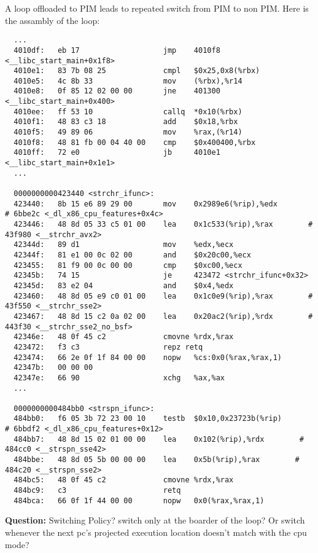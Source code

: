 \documentclass[11pt]{article}
\begin{document}
A loop offloaded to PIM leads to repeated switch from PIM to non PIM. Here is the assambly of the loop:
\begin{framed}
	\begin{verbatim}
  ...
  4010df:	eb 17                	jmp    4010f8 <__libc_start_main+0x1f8>
  4010e1:	83 7b 08 25          	cmpl   $0x25,0x8(%rbx)
  4010e5:	4c 8b 33             	mov    (%rbx),%r14
  4010e8:	0f 85 12 02 00 00    	jne    401300 <__libc_start_main+0x400>
  4010ee:	ff 53 10             	callq  *0x10(%rbx)
  4010f1:	48 83 c3 18          	add    $0x18,%rbx
  4010f5:	49 89 06             	mov    %rax,(%r14)
  4010f8:	48 81 fb 00 04 40 00 	cmp    $0x400400,%rbx
  4010ff:	72 e0                	jb     4010e1 <__libc_start_main+0x1e1>
  ...
  
  0000000000423440 <strchr_ifunc>:
  423440:	8b 15 e6 89 29 00    	mov    0x2989e6(%rip),%edx        # 6bbe2c <_dl_x86_cpu_features+0x4c>
  423446:	48 8d 05 33 c5 01 00 	lea    0x1c533(%rip),%rax        # 43f980 <__strchr_avx2>
  42344d:	89 d1                	mov    %edx,%ecx
  42344f:	81 e1 00 0c 02 00    	and    $0x20c00,%ecx
  423455:	81 f9 00 0c 00 00    	cmp    $0xc00,%ecx
  42345b:	74 15                	je     423472 <strchr_ifunc+0x32>
  42345d:	83 e2 04             	and    $0x4,%edx
  423460:	48 8d 05 e9 c0 01 00 	lea    0x1c0e9(%rip),%rax        # 43f550 <__strchr_sse2>
  423467:	48 8d 15 c2 0a 02 00 	lea    0x20ac2(%rip),%rdx        # 443f30 <__strchr_sse2_no_bsf>
  42346e:	48 0f 45 c2          	cmovne %rdx,%rax
  423472:	f3 c3                	repz retq 
  423474:	66 2e 0f 1f 84 00 00 	nopw   %cs:0x0(%rax,%rax,1)
  42347b:	00 00 00 
  42347e:	66 90                	xchg   %ax,%ax
  ...
  
  0000000000484bb0 <strspn_ifunc>:
  484bb0:	f6 05 3b 72 23 00 10 	testb  $0x10,0x23723b(%rip)        # 6bbdf2 <_dl_x86_cpu_features+0x12>
  484bb7:	48 8d 15 02 01 00 00 	lea    0x102(%rip),%rdx        # 484cc0 <__strspn_sse42>
  484bbe:	48 8d 05 5b 00 00 00 	lea    0x5b(%rip),%rax        # 484c20 <__strspn_sse2>
  484bc5:	48 0f 45 c2          	cmovne %rdx,%rax
  484bc9:	c3                   	retq   
  484bca:	66 0f 1f 44 00 00    	nopw   0x0(%rax,%rax,1)

	\end{verbatim}
\end{framed}

\textbf{Question: } Switching Policy? switch only at the boarder of the loop? Or switch whenever the next pc's projected execution location doesn't match with the cpu mode?\\
\end{document}
